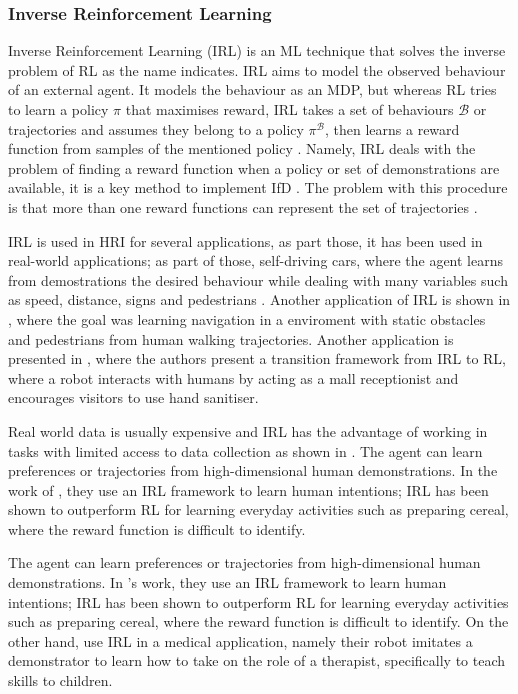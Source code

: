 \documentclass[thesis]{mas_proposal}
\begin{document}
	\subsubsection{Inverse Reinforcement Learning}
		
		Inverse Reinforcement Learning (IRL) is an ML technique that solves the inverse problem of RL as the name indicates. IRL aims to model the observed behaviour of an external agent. It models the behaviour as an MDP, but whereas RL tries to learn a policy $\pi$ that maximises reward, IRL takes a set of behaviours $\mathcal{B}$ or trajectories and assumes they belong to a policy $\pi^\mathcal{B}$, then learns a reward function from samples of the mentioned policy \cite{Heim2019}. Namely, IRL deals with the problem of finding a reward function when a policy or set of demonstrations are available, it is a key method to implement IfD \cite{Arora2021}. The problem with this procedure is that more than one reward functions can represent the set of trajectories \cite{Russell2000}. 
		
		IRL is used in HRI for several applications, as part those, it has been used in real-world applications; as part of those, self-driving cars, where the agent learns from demostrations the desired behaviour while dealing with many variables such as speed, distance, signs and pedestrians \cite{Arora2021} . Another application of IRL is shown in \cite{Kretzschmar2016}, where the goal was learning navigation in a enviroment with static obstacles and pedestrians from human walking trajectories. Another application is presented in \cite{Chen2023}, where the authors present a transition framework from IRL to RL, where a robot interacts with humans by acting as a mall receptionist and encourages visitors to use hand sanitiser. 
		
		Real world data is usually expensive and IRL has the advantage of working in tasks with limited access to data collection as shown in \cite{Chen2023}. The agent can learn preferences or trajectories from high-dimensional human demonstrations. In the work of \cite{Bhattacharyya2020}, they use an IRL framework to learn human intentions; IRL has been shown to outperform RL for learning everyday activities such as preparing cereal, where the reward function is difficult to identify. 
		
		The agent can learn preferences or trajectories from high-dimensional human demonstrations. In \cite{Bhattacharyya2020}'s work, they use an IRL framework to learn human intentions; IRL has been shown to outperform RL for learning everyday activities such as preparing cereal, where the reward function is difficult to identify. On the other hand, \cite{Hussein2019} use IRL in a medical application, namely their robot imitates a demonstrator to learn how to take on the role of a therapist, specifically to teach skills to children.  
		
\end{document}
